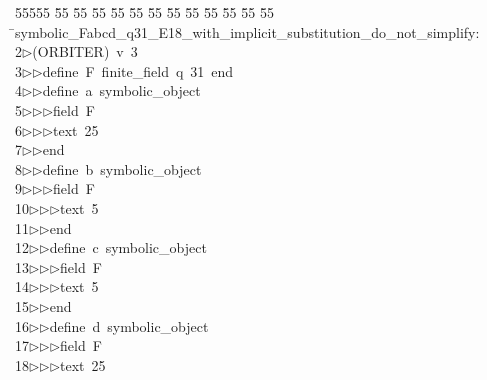 %
%
\begin{tabbing}
55555 \= 55 \= 55 \= 55 \= 55 \= 55 \= 55 \= 55 \= 55 \= 55 \= 55 \= 55 \= 55 \= \>symbolic\_Fabcd\_q31\_E18\_with\_implicit\_substitution\_do\_not\_simplify:\\[0pt]
2\>$\triangleright$\>(ORBITER)\ v\ 3\ \\[0pt]
3\>$\triangleright$\>$\triangleright$\>define\ F\ finite\_field\ q\ 31\ end\ \\[0pt]
4\>$\triangleright$\>$\triangleright$\>define\ a\ symbolic\_object\ \\[0pt]
5\>$\triangleright$\>$\triangleright$\>$\triangleright$\>field\ F\ \\[0pt]
6\>$\triangleright$\>$\triangleright$\>$\triangleright$\>text\ 25\ \\[0pt]
7\>$\triangleright$\>$\triangleright$\>end\ \\[0pt]
8\>$\triangleright$\>$\triangleright$\>define\ b\ symbolic\_object\ \\[0pt]
9\>$\triangleright$\>$\triangleright$\>$\triangleright$\>field\ F\ \\[0pt]
10\>$\triangleright$\>$\triangleright$\>$\triangleright$\>text\ 5\ \\[0pt]
11\>$\triangleright$\>$\triangleright$\>end\ \\[0pt]
12\>$\triangleright$\>$\triangleright$\>define\ c\ symbolic\_object\ \\[0pt]
13\>$\triangleright$\>$\triangleright$\>$\triangleright$\>field\ F\ \\[0pt]
14\>$\triangleright$\>$\triangleright$\>$\triangleright$\>text\ 5\ \\[0pt]
15\>$\triangleright$\>$\triangleright$\>end\ \\[0pt]
16\>$\triangleright$\>$\triangleright$\>define\ d\ symbolic\_object\ \\[0pt]
17\>$\triangleright$\>$\triangleright$\>$\triangleright$\>field\ F\ \\[0pt]
18\>$\triangleright$\>$\triangleright$\>$\triangleright$\>text\ 25\ \\[0pt]

\end{tabbing}
